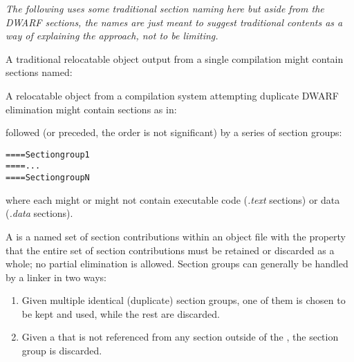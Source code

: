 \textit{The following uses some traditional section naming here
but aside from the DWARF sections, the names are just meant
to suggest traditional contents as a way of explaining the
approach, not to be limiting.}

A traditional relocatable object output 
from a single compilation might contain sections 
named:
\begin{alltt}
\end{alltt}
A relocatable object from a compilation system 
attempting duplicate DWARF elimination might
contain sections as in:

\begin{alltt}
\end{alltt}

followed (or preceded, the order is not significant) 
by a series of 
section groups:
\begin{alltt}
==== Section group 1
==== ...
==== Section group N
\end{alltt}

where each  might or might not contain executable
code (\textit{.text} sections) or data (\textit{.data} sections).

A \textit{} is a named set 
of section contributions
within an object file with the property that the entire set
of section contributions must be retained or discarded as a
whole; no partial elimination is allowed. Section groups can
generally be handled by a linker in two ways:
\begin{enumerate}[1. ]

\item Given multiple identical (duplicate) section groups,
one of them is chosen to be kept and used, while the rest
are discarded.

\item Given a  
that is not referenced from any
section outside of the , 
the section group
is discarded.

\end{enumerate}


